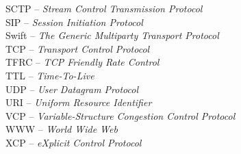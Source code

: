SCTP		-- \textit{Stream Control Transmission Protocol}\\
SIP		-- \textit{Session Initiation Protocol}\\
Swift		-- \textit{The Generic Multiparty Transport Protocol}\\
TCP		-- \textit{Transport Control Protocol}\\
TFRC		-- \textit{TCP Friendly Rate Control}\\
TTL		-- \textit{Time-To-Live}\\
UDP		-- \textit{User Datagram Protocol}\\
URI		-- \textit{Uniform Resource Identifier}\\
VCP		-- \textit{Variable-Structure Congestion Control Protocol}\\
WWW		-- \textit{World Wide Web}\\
XCP		-- \textit{eXplicit Control Protocol}\\